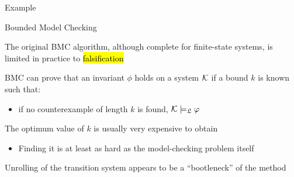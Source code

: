 \begin{frame}{Example}

\end{frame}


\begin{frame}{Bounded Model Checking}

The original BMC algorithm, although complete for finite-state systems, is
limited in practice to \hl{falsification}

\bigskip
BMC can prove that an invariant $\phi$ holds on a system ${\cal K}$ if a bound $k$
is known such that:
\begin{itemize}
  \item if no counterexample of length $k$ is found, ${\cal K} \models_{\mathfrak{L}} \varphi$
\end{itemize}

\bigskip
The optimum value of $k$ is usually very expensive to obtain
\begin{itemize}
  \item Finding it is at least as hard as the model-checking problem itself
\end{itemize}

\bigskip
Unrolling of the transition system appears to be a ``bootleneck'' of the method
\end{frame}

